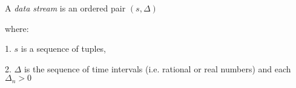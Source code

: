 \documentclass[12pt]{article}
\begin{document}
A {\it data stream} is an ordered pair $\left( s,\Delta \right) $

where:

 1. $s$ is a sequence of tuples,

 2. $\Delta $ is the sequence of time intervals (i.e. rational or real numbers) and each $\Delta _{n} > 0$

\end{document}
